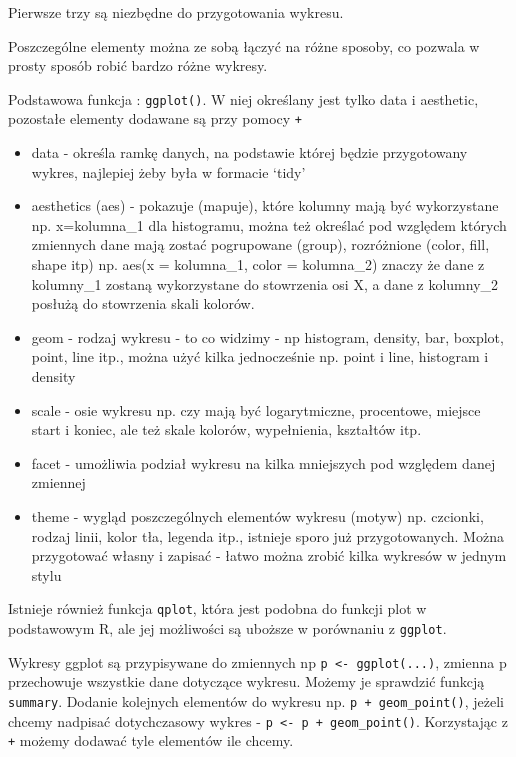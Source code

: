 \documentclass[
]{book}
\begin{document}
Pierwsze trzy są niezbędne do przygotowania wykresu.

Poszczególne elementy można ze sobą łączyć na różne sposoby, co pozwala w prosty sposób robić bardzo różne wykresy.

Podstawowa funkcja : \texttt{ggplot()}. W niej określany jest tylko data i aesthetic, pozostałe elementy dodawane są przy pomocy \texttt{+}

\begin{itemize}
\item
  data - określa ramkę danych, na podstawie której będzie przygotowany wykres, najlepiej żeby była w formacie `tidy'
\item
  aesthetics (aes) - pokazuje (mapuje), które kolumny mają być wykorzystane np. x=kolumna\_1 dla histogramu, można też określać pod względem których zmiennych dane mają zostać pogrupowane (group), rozróżnione (color, fill, shape itp) np. aes(x = kolumna\_1, color = kolumna\_2) znaczy że dane z kolumny\_1 zostaną wykorzystane do stowrzenia osi X, a dane z kolumny\_2 posłużą do stowrzenia skali kolorów.
\item
  geom - rodzaj wykresu - to co widzimy - np histogram, density, bar, boxplot, point, line itp., można użyć kilka jednocześnie np. point i line, histogram i density
\item
  scale - osie wykresu np. czy mają być logarytmiczne, procentowe, miejsce start i koniec, ale też skale kolorów, wypełnienia, kształtów itp.
\item
  facet - umożliwia podział wykresu na kilka mniejszych pod względem danej zmiennej
\item
  theme - wygląd poszczególnych elementów wykresu (motyw) np. czcionki, rodzaj linii, kolor tła, legenda itp., istnieje sporo już przygotowanych. Można przygotować własny i zapisać - łatwo można zrobić kilka wykresów w jednym stylu
\end{itemize}

Istnieje również funkcja \texttt{qplot}, która jest podobna do funkcji plot w podstawowym R, ale jej możliwości są uboższe w porównaniu z \texttt{ggplot}.

Wykresy ggplot są przypisywane do zmiennych np \texttt{p\ \textless{}-\ ggplot(...)}, zmienna p przechowuje wszystkie dane dotyczące wykresu. Możemy je sprawdzić funkcją \texttt{summary}. Dodanie kolejnych elementów do wykresu np. \texttt{p\ +\ geom\_point()}, jeżeli chcemy nadpisać dotychczasowy wykres - \texttt{p\ \textless{}-\ p\ +\ geom\_point()}. Korzystając z \texttt{+} możemy dodawać tyle elementów ile chcemy.
\end{document}
